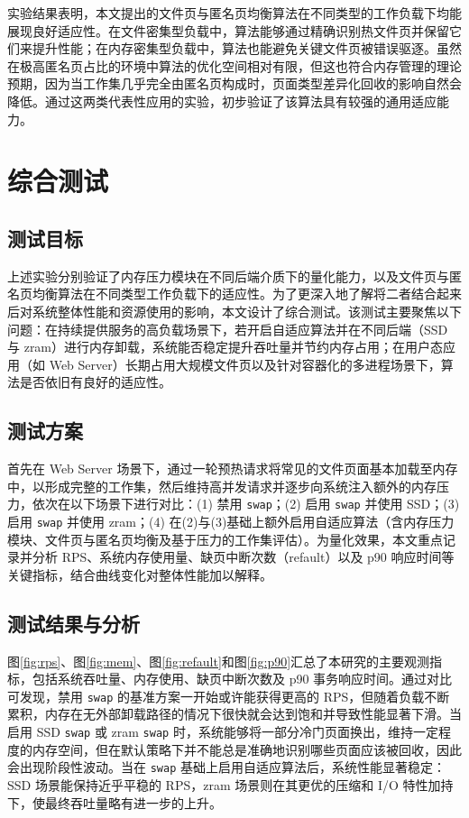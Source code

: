实验结果表明，本文提出的文件页与匿名页均衡算法在不同类型的工作负载下均能展现良好适应性。在文件密集型负载中，算法能够通过精确识别热文件页并保留它们来提升性能；在内存密集型负载中，算法也能避免关键文件页被错误驱逐。虽然在极高匿名页占比的环境中算法的优化空间相对有限，但这也符合内存管理的理论预期，因为当工作集几乎完全由匿名页构成时，页面类型差异化回收的影响自然会降低。通过这两类代表性应用的实验，初步验证了该算法具有较强的通用适应能力。

\section{综合测试}

\subsection{测试目标}

上述实验分别验证了内存压力模块在不同后端介质下的量化能力，以及文件页与匿名页均衡算法在不同类型工作负载下的适应性。为了更深入地了解将二者结合起来后对系统整体性能和资源使用的影响，本文设计了综合测试。该测试主要聚焦以下问题：在持续提供服务的高负载场景下，若开启自适应算法并在不同后端（SSD 与 zram）进行内存卸载，系统能否稳定提升吞吐量并节约内存占用；在用户态应用（如 Web Server）长期占用大规模文件页以及针对容器化的多进程场景下，算法是否依旧有良好的适应性。

\subsection{测试方案}

首先在 Web Server 场景下，通过一轮预热请求将常见的文件页面基本加载至内存中，以形成完整的工作集，然后维持高并发请求并逐步向系统注入额外的内存压力，依次在以下场景下进行对比：(1) 禁用 \texttt{swap}；(2) 启用 \texttt{swap} 并使用 SSD；(3) 启用 \texttt{swap} 并使用 zram；(4) 在(2)与(3)基础上额外启用自适应算法（含内存压力模块、文件页与匿名页均衡及基于压力的工作集评估）。为量化效果，本文重点记录并分析 RPS、系统内存使用量、缺页中断次数（refault）以及 p90 响应时间等关键指标，结合曲线变化对整体性能加以解释。

\subsection{测试结果与分析}
\label{sec:test_result}

图\ref{fig:rps}、图\ref{fig:mem}、图\ref{fig:refault}和图\ref{fig:p90}汇总了本研究的主要观测指标，包括系统吞吐量、内存使用、缺页中断次数及 p90 事务响应时间。通过对比可发现，禁用 \texttt{swap} 的基准方案一开始或许能获得更高的 RPS，但随着负载不断累积，内存在无外部卸载路径的情况下很快就会达到饱和并导致性能显著下滑。当启用 SSD \texttt{swap} 或 zram \texttt{swap} 时，系统能够将一部分冷门页面换出，维持一定程度的内存空间，但在默认策略下并不能总是准确地识别哪些页面应该被回收，因此会出现阶段性波动。当在 \texttt{swap} 基础上启用自适应算法后，系统性能显著稳定：SSD 场景能保持近乎平稳的 RPS，zram 场景则在其更优的压缩和 I/O 特性加持下，使最终吞吐量略有进一步的上升。

